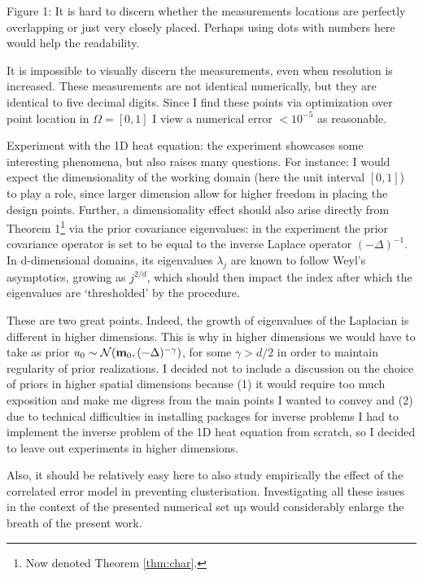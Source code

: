 \RC Figure 1: It is hard to discern whether the measurements locations
are perfectly overlapping or just very closely placed. Perhaps using
dots with numbers here would help the readability.
  
\AR It is impossible to visually discern the measurements, even when
resolution is increased. These measurements are not identical
numerically, but they are identical to five decimal digits. Since I
find these points via optimization over point location in
$\Omega=[0,1]$ I view a numerical error $<10^{-5}$ as reasonable.

\RC Experiment with the 1D heat equation: the experiment showcases
some interesting phenomena, but also raises many questions. For
instance: I would expect the dimensionality of the working domain
(here the unit interval $[0, 1]$) to play a role, since larger
dimension allow for higher freedom in placing the design points.
Further, a dimensionality effect should also arise directly from
Theorem 1\footnote{Now denoted Theorem \ref{thm:char}.} via the prior
covariance eigenvalues: in the experiment the prior covariance
operator is set to be equal to the inverse Laplace operator
$(-\Delta)^{-1}$. In d-dimensional domains, its eigenvalues
$\lambda_j$ are known to follow Weyl’s asymptotics, growing as
$j^{2/d}$, which should then impact the index after which the
eigenvalues are ‘thresholded’ by the procedure.

\AR These are two great points. Indeed, the growth of eigenvalues of
the Laplacian is different in higher dimensions. This is why in higher
dimensions we would have to take as prior \(u_0 \sim
\mathcal{N}(\mathbf{m}_0, (-\Delta)^{-\gamma})\), for some \(\gamma >
d/2\) in order to maintain regularity of prior realizations. I decided
not to include a discussion on the choice of priors in higher spatial
dimensions because (1) it would require too much exposition and make
me digress from the main points I wanted to convey and (2) due to
technical difficulties in installing packages for inverse problems
\cite{attia2023pyoed, VillaPetraGhattas16} I had to implement the
inverse problem of the 1D heat equation from scratch, so I decided to
leave out experiments in higher dimensions.

  
\RC Also, it should be relatively easy here to also study empirically
the effect of the correlated error model in preventing
clusterisation. Investigating all these issues in the context of the
presented numerical set up would considerably enlarge the breath of
the present work.

